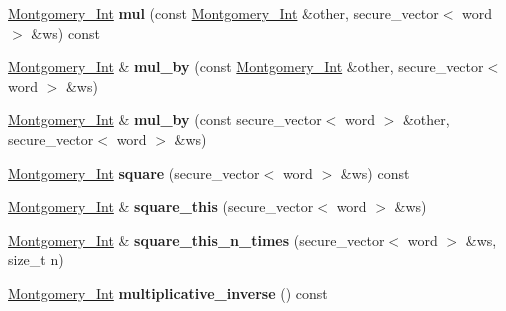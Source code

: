 \begin{DoxyCompactItemize}
\hyperlink{class_botan_1_1_montgomery___int}{Montgomery\+\_\+\+Int} {\bfseries mul} (const \hyperlink{class_botan_1_1_montgomery___int}{Montgomery\+\_\+\+Int} \&other, secure\+\_\+vector$<$ word $>$ \&ws) const
\item 
\mbox{\label{class_botan_1_1_montgomery___int_a4a23a045a74bc601b2af4fbfbf54666f}} 
\hyperlink{class_botan_1_1_montgomery___int}{Montgomery\+\_\+\+Int} \& {\bfseries mul\+\_\+by} (const \hyperlink{class_botan_1_1_montgomery___int}{Montgomery\+\_\+\+Int} \&other, secure\+\_\+vector$<$ word $>$ \&ws)
\item 
\mbox{\label{class_botan_1_1_montgomery___int_a736f6daa68a449806d6740c8a2b09f6a}} 
\hyperlink{class_botan_1_1_montgomery___int}{Montgomery\+\_\+\+Int} \& {\bfseries mul\+\_\+by} (const secure\+\_\+vector$<$ word $>$ \&other, secure\+\_\+vector$<$ word $>$ \&ws)
\item 
\mbox{\label{class_botan_1_1_montgomery___int_a4dacf7853057df8db087d5eb096a7cc4}} 
\hyperlink{class_botan_1_1_montgomery___int}{Montgomery\+\_\+\+Int} {\bfseries square} (secure\+\_\+vector$<$ word $>$ \&ws) const
\item 
\mbox{\label{class_botan_1_1_montgomery___int_afe8085887a9f3b9704a2f3c93998615b}} 
\hyperlink{class_botan_1_1_montgomery___int}{Montgomery\+\_\+\+Int} \& {\bfseries square\+\_\+this} (secure\+\_\+vector$<$ word $>$ \&ws)
\item 
\mbox{\label{class_botan_1_1_montgomery___int_a135ee1c149aa1cfc9fe030f44f51af09}} 
\hyperlink{class_botan_1_1_montgomery___int}{Montgomery\+\_\+\+Int} \& {\bfseries square\+\_\+this\+\_\+n\+\_\+times} (secure\+\_\+vector$<$ word $>$ \&ws, size\+\_\+t n)
\item 
\mbox{\label{class_botan_1_1_montgomery___int_ae65f3e4ec57b3d80d9e8885cb825ab92}} 
\hyperlink{class_botan_1_1_montgomery___int}{Montgomery\+\_\+\+Int} {\bfseries multiplicative\+\_\+inverse} () const
\item 
\mbox{\label{class_botan_1_1_montgomery___int_a6b2ef62e6caa40b808c29a761575e631}} 

\end{DoxyCompactItemize}
